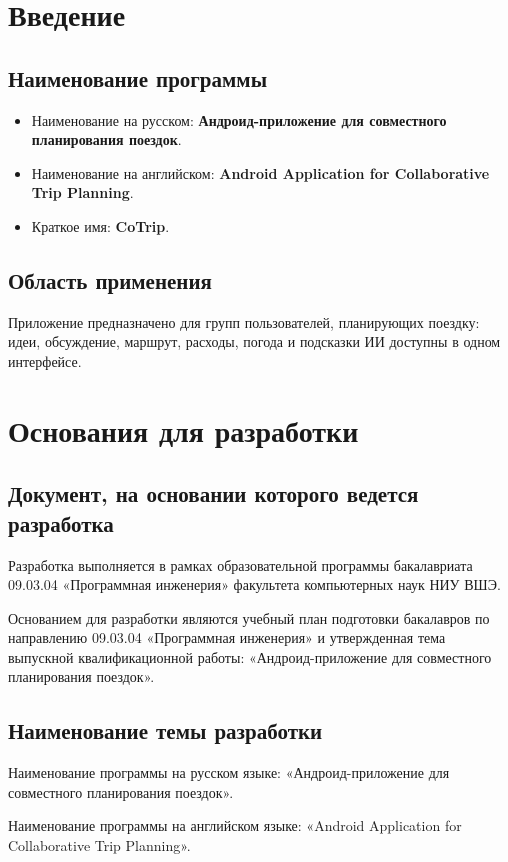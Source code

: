 \documentclass[12pt,a4paper]{article}
\begin{document}
\clearpage
\section{Введение}

\subsection{Наименование программы}
\begin{itemize}
  \item Наименование на русском: \textbf{Андроид-приложение для совместного планирования поездок}.
  \item Наименование на английском: \textbf{Android Application for Collaborative Trip Planning}.
  \item Краткое имя: \textbf{CoTrip}.
\end{itemize}

\subsection{Область применения}
Приложение предназначено для групп пользователей, планирующих поездку: идеи, обсуждение,
маршрут, расходы, погода и подсказки ИИ доступны в одном интерфейсе.

\clearpage
\section{Основания для разработки}
\subsection{Документ, на основании которого ведется разработка}
Разработка выполняется в рамках образовательной программы бакалавриата 09.03.04
«Программная инженерия» факультета компьютерных наук НИУ ВШЭ.

Основанием для разработки являются учебный план подготовки бакалавров по направлению
09.03.04 «Программная инженерия» и утвержденная тема выпускной квалификационной работы:
«Андроид-приложение для совместного планирования поездок».

\subsection{Наименование темы разработки}
Наименование программы на русском языке: «Андроид-приложение для совместного планирования поездок».

Наименование программы на английском языке: «Android Application for Collaborative Trip Planning».
\end{document}
